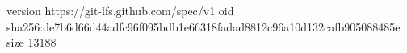 version https://git-lfs.github.com/spec/v1
oid sha256:de7b6d66d44adfc96f095bdb1e66318fadad8812c96a10d132cafb905088485e
size 13188
